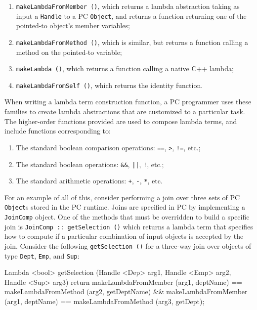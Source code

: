 \begin{enumerate}

\item \texttt{makeLambdaFromMember ()}, which returns 
a lambda abstraction taking as input a \texttt{Handle} to a PC \texttt{Object}, and returns a function returning one of the pointed-to object's member variables;

\item 
\texttt{makeLambdaFromMethod ()}, which is similar, but returns a function calling a method on the pointed-to variable;

\item \texttt{makeLambda ()}, which returns a function calling
a native C++ lambda;

\item \texttt{makeLambdaFromSelf ()}, which returns the identity function.

\end{enumerate}

\noindent
When writing a lambda term construction function, a PC programmer uses these families to create lambda abstractions that
are customized to a particular task.
The higher-order functions provided are used to compose lambda terms, and
include functions corresponding to:

\begin{enumerate}
\item
The standard boolean comparison operations: \texttt{==}, \texttt{>}, \texttt{!=}, etc.;

\item
The standard boolean
operations: \texttt{\&\&}, \texttt{||}, \texttt{!}, etc.;

\item
The standard arithmetic operations: \texttt{+}, \texttt{-}, \texttt{*}, etc.  
\end{enumerate}

For an example of all of this, consider performing a join over three
sets of PC \texttt{Object}s stored in the PC runtime.  
Joins are specified in PC 
by implementing a \texttt{JoinComp} object. One of the methods that must be overridden to build a specific join is \texttt{JoinComp :: getSelection ()}
which returns a lambda term
that specifies how to compute if a particular combination of input objects is accepted by the join.  Consider the following
\texttt{getSelection ()} for a three-way join over objects of type \texttt{Dept}, \texttt{Emp}, and \texttt{Sup}:


\begin{codesmall} 
Lambda <bool> getSelection (Handle <Dep> arg1, 
    Handle <Emp> arg2, Handle <Sup> arg3) {
	return makeLambdaFromMember (arg1, deptName) == 
	       makeLambdaFromMethod (arg2, getDeptName) &&
	       makeLambdaFromMember (arg1, deptName) == 
               makeLambdaFromMethod (arg3, getDept);   }
\end{codesmall}

